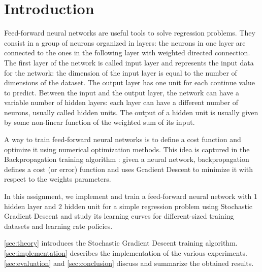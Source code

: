 \section{Introduction}
\label{sec:introduction}

Feed-forward neural networks are useful tools to solve regression problems.
They consist in a group of neurons organized in layers:
the neurons in one layer are connected to the ones in the following layer with weighted directed connection.
The first layer of the network is called input layer and represents the input data for the network:
the dimension of the input layer is equal to the number of dimensions of the dataset.
The output layer has one unit for each continue value to predict.
Between the input and the output layer, the network can have a variable number of hidden layers:
each layer can have a different number of neurons, usually called hidden units.
The output of a hidden unit is usually given by some non-linear function of the weighted sum of its input.

A way to train feed-forward neural networks is to define a cost function and optimize it using numerical optimization methods.
This idea is captured in the Backpropagation training algorithm \cite{backpropagation}:
given a neural network, backpropagation defines a cost (or error) function and uses Gradient Descent to minimize it with respect to the weights parameters.

In this assignment, we implement and train a feed-forward neural network with $1$ hidden layer and $2$ hidden unit for a simple regression problem using Stochastic Gradient Descent and study its learning curves for different-sized training datasets and learning rate policies.

\cref{sec:theory} introduces the Stochastic Gradient Descent training algorithm.
\cref{sec:implementation} describes the implementation of the various experiments.
\cref{sec:evaluation} and \cref{sec:conclusion} discuss and summarize the obtained results.
